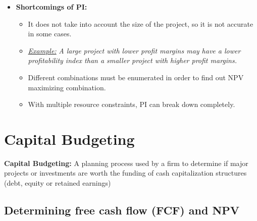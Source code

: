 \documentclass[ieeetran]{article}
\begin{document}
\begin{itemize}
\begin{itemize}
\end{itemize}
\item \textbf{Shortcomings of PI:}
	\begin{itemize}
	  \item It does not take into account the size of the project, so it is not accurate in some cases.
	\item \underline{\textit{Example:}} \textit{A large project with lower profit margins may have a lower profitability index than a smaller project with higher profit margins.}
	\item Different combinations must be enumerated in order to find out NPV maximizing combination.
	\item With multiple resource constraints, PI can break down completely.
	\end{itemize}

\end{itemize}

\section{Capital Budgeting} %
\label{sub:capital_budgeting}
\textbf{Capital Budgeting:} A planning process used by a firm to determine if major projects or investments are worth the funding of cash capitalization structures (debt, equity or retained earnings)

\subsection{Determining free cash flow (FCF) and NPV} %
\label{ssub:determining_free_cash_flow_fCF_and_nPV}
\end{document}
